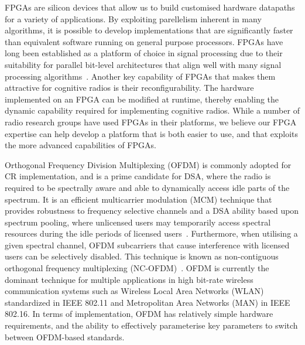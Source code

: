 FPGAs are silicon devices that allow us to build customised hardware datapaths for a variety of applications.
By exploiting parellelism inherent in many algorithms, it is possible to develop implementations that are significantly faster than equivalent software running on general purpose processors.
FPGAs have long been established as a platform of choice in signal processing due to their suitability for parallel bit-level architectures that align well with many signal processing algorithms~\cite{cummings1999}.
Another key capability of FPGAs that makes them attractive for cognitive radios is their reconfigurability.
The hardware implemented on an FPGA can be modified at runtime, thereby enabling the dynamic capability required for implementing cognitive radios.
While a number of radio research groups have used FPGAs in their platforms, we believe our FPGA expertise can help develop a platform that is both easier to use, and that exploits the more advanced capabilities of FPGAs.


Orthogonal Frequency Division Multiplexing (OFDM) is commonly adopted for CR implementation, and is a prime candidate for DSA, where the radio is required to be spectrally aware and able to dynamically access idle parts of the spectrum.
It is an efficient multicarrier modulation (MCM) technique that provides robustness to frequency selective channels and a DSA ability based upon spectrum pooling, where unlicensed users may temporarily access spectral resources during the idle periods of licensed users~\cite{JondralMarch2004}.
Furthermore, when utilising a given spectral channel, OFDM subcarriers that cause interference with licensed users can be selectively disabled.
 This technique is known as non-contiguous orthogonal frequency multiplexing (NC-OFDM)~\cite{MindenJune2006}.
OFDM is currently the dominant technique for multiple applications in high bit-rate wireless communication systems such as Wireless Local Area Networks (WLAN) standardized in IEEE 802.11 and Metropolitan Area Networks (MAN) in IEEE 802.16.
In terms of implementation, OFDM has relatively simple hardware requirements, and the ability to effectively parameterise key parameters to switch between OFDM-based standards.

